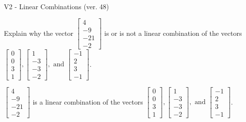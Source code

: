 \begin{exercise}
  \begin{exerciseTitle}V2 - Linear Combinations (ver. 48)\end{exerciseTitle}
  \begin{exerciseStatement}
    Explain why the vector \(\left[\begin{array}{c}
4 \\
-9 \\
-21 \\
-2
\end{array}\right]\)  is or is not a linear 
	combination of the vectors \(\left[\begin{array}{c}
0 \\
0 \\
3 \\
1
\end{array}\right] , \left[\begin{array}{c}
1 \\
-3 \\
-3 \\
-2
\end{array}\right] , \text{ and } \left[\begin{array}{c}
-1 \\
2 \\
3 \\
-1
\end{array}\right]\).
	


  \end{exerciseStatement}
  \begin{exerciseAnswer}
   \(\left[\begin{array}{c}
4 \\
-9 \\
-21 \\
-2
\end{array}\right]\) 
  	 is  
	a linear combination of the vectors \(\left[\begin{array}{c}
0 \\
0 \\
3 \\
1
\end{array}\right] , \left[\begin{array}{c}
1 \\
-3 \\
-3 \\
-2
\end{array}\right] , \text{ and } \left[\begin{array}{c}
-1 \\
2 \\
3 \\
-1
\end{array}\right]\).

	
  


  \end{exerciseAnswer}
\end{exercise}